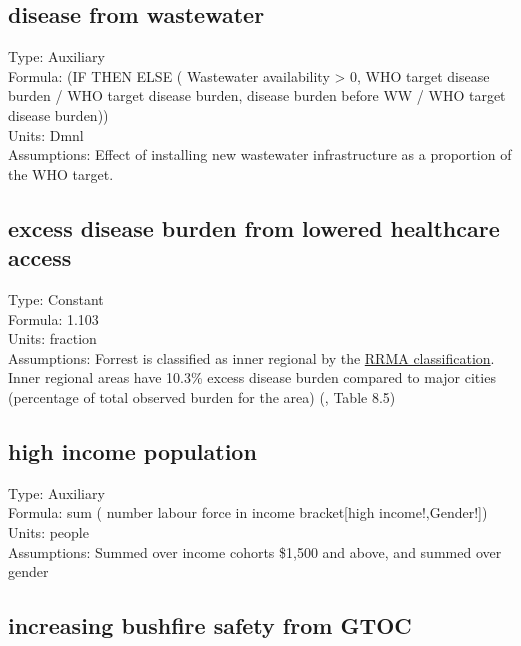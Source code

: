 \documentclass[
  11pt,
]{book}
\begin{document}
\hypertarget{disease-from-wastewater}{%
\subsection{disease from wastewater}\label{disease-from-wastewater}}

Type: Auxiliary\\
Formula: (IF THEN ELSE ( Wastewater availability \textgreater{} 0, WHO target disease burden / WHO target disease burden, disease burden before WW / WHO target disease burden))\\
Units: Dmnl\\
Assumptions: Effect of installing new wastewater infrastructure as a proportion of the WHO target.

\hypertarget{excess-disease-burden-from-lowered-healthcare-access}{%
\subsection{excess disease burden from lowered healthcare access}\label{excess-disease-burden-from-lowered-healthcare-access}}

Type: Constant\\
Formula: 1.103\\
Units: fraction\\
Assumptions: Forrest is classified as inner regional by the \href{https://www.health.gov.au/health-topics/health-workforce/health-workforce-classifications/rural-remote-and-metropolitan-area}{RRMA classification}. Inner regional areas have 10.3\% excess disease burden compared to major cities (percentage of total observed burden for the area) (\citet{australian_institute_of_health_and_welfare_australian_2019}, Table 8.5)

\hypertarget{high-income-population}{%
\subsection{high income population}\label{high-income-population}}

Type: Auxiliary\\
Formula: sum ( number labour force in income bracket{[}high income!,Gender!{]})\\
Units: people\\
Assumptions: Summed over income cohorts \$1,500 and above, and summed over gender

\hypertarget{increasing-bushfire-safety-from-gtoc}{%
\subsection{increasing bushfire safety from GTOC}\label{increasing-bushfire-safety-from-gtoc}}
\end{document}
